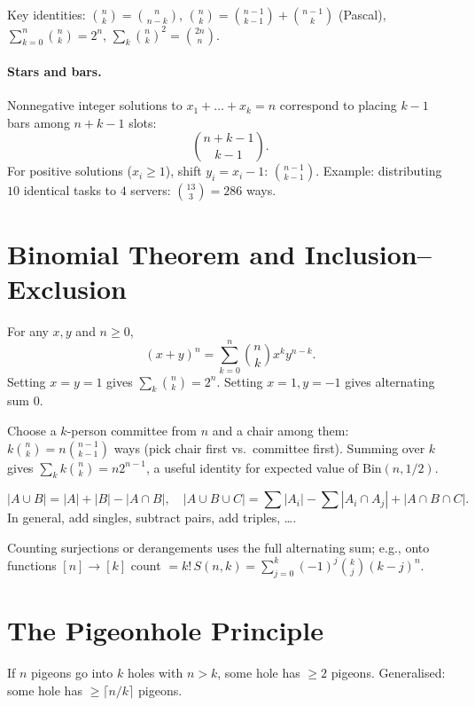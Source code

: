 Key identities: $\binom{n}{k}=\binom{n}{n-k}$, $\binom{n}{k}=\binom{n-1}{k-1}+\binom{n-1}{k}$ (Pascal), $\sum_{k=0}^n\binom{n}{k}=2^n$, $\sum_k\binom{n}{k}^2=\binom{2n}{n}$.

\paragraph{Stars and bars.} Nonnegative integer solutions to $x_1+\dots+x_k=n$ correspond to placing $k-1$ bars among $n+k-1$ slots:
\[
\binom{n+k-1}{k-1}.
\]
For positive solutions ($x_i\ge1$), shift $y_i=x_i-1$: $\binom{n-1}{k-1}$. Example: distributing $10$ identical tasks to $4$ servers: $\binom{13}{3}=286$ ways.

\section{Binomial Theorem and Inclusion--Exclusion}
\label{sec:inclusion}
\begin{theorem} For any $x,y$ and $n\ge0$,
\[
(x+y)^n=\sum_{k=0}^n\binom{n}{k}x^k y^{n-k}.
\]
Setting $x=y=1$ gives $\sum_k\binom{n}{k}=2^n$. Setting $x=1,y=-1$ gives alternating sum $0$.
\end{theorem}

\begin{example} Choose a $k$-person committee from $n$ and a chair among them: $k\binom{n}{k}=n\binom{n-1}{k-1}$ ways (pick chair first vs.\ committee first). Summing over $k$ gives $\sum_k k\binom{n}{k}=n2^{n-1}$, a useful identity for expected value of $\mathrm{Bin}(n,1/2)$.
\end{example}

\begin{theorem}
\[
|A\cup B|=|A|+|B|-|A\cap B|,\quad |A\cup B\cup C|=\sum|A_i|-\sum|A_i\cap A_j|+|A\cap B\cap C|.
\]
In general, add singles, subtract pairs, add triples, \dots.
\end{theorem}

\begin{example} Counting surjections or derangements uses the full alternating sum; e.g., onto functions $[n]\to[k]$ count $=k!\,S(n,k)=\sum_{j=0}^k(-1)^j\binom{k}{j}(k-j)^n$.
\end{example}

\section{The Pigeonhole Principle}
\label{sec:pigeonhole}
\begin{theorem} If $n$ pigeons go into $k$ holes with $n>k$, some hole has $\ge2$ pigeons. Generalised: some hole has $\ge\lceil n/k\rceil$ pigeons.
\end{theorem}

